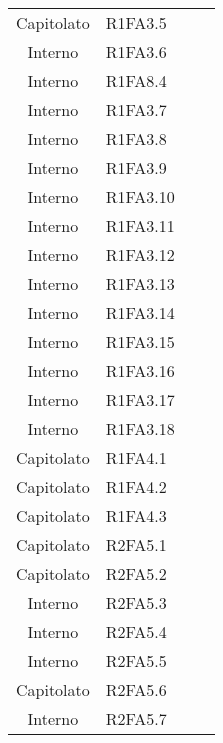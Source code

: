{\begin{longtable}{ c C{4cm} c c}
Capitolato & R1FA3.5\\

Interno & R1FA3.6\\

Interno & R1FA8.4\\

Interno & R1FA3.7\\

Interno & R1FA3.8\\

Interno & R1FA3.9\\

Interno & R1FA3.10\\

Interno & R1FA3.11\\

Interno & R1FA3.12\\

Interno & R1FA3.13\\


Interno & R1FA3.14\\

Interno & R1FA3.15\\

Interno & R1FA3.16\\

Interno & R1FA3.17\\

Interno & R1FA3.18\\

Capitolato & R1FA4.1\\

Capitolato & R1FA4.2\\

Capitolato & R1FA4.3\\

Capitolato & R2FA5.1\\

Capitolato & R2FA5.2\\


Interno & R2FA5.3\\

Interno & R2FA5.4\\

Interno & R2FA5.5\\

Capitolato & R2FA5.6\\

Interno & R2FA5.7\\


\end{longtable}}
